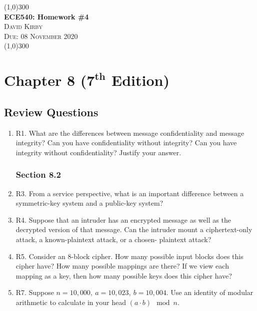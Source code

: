 \documentclass[12pt]{article}
\begin{document}
\thispagestyle{empty}

 	\begin{center}
    \line(1,0){300}\\[0.25cm]
 	\Large{\bfseries ECE540: Homework \#4}\\
 	\textsc{\large David Kirby}\\
 	\textsc{\large Due: 08 November 2020}\\
 	\line(1,0){300}\\[0.75cm]
 	\end{center}
\section*{Chapter 8 (\(\bm{7^{th}}\) Edition)}
\subsection*{Review Questions}
\begin{enumerate}
\subsubsection*{Section 8.1}
\item R1. What are the differences between message confidentiality and message integrity? Can you have confidentiality without integrity? Can you have integrity without confidentiality? Justify your answer.
\subsubsection*{Section 8.2}
\item R3. From a service perspective, what is an important difference between a symmetric-key system and a public-key system?
\item R4. Suppose that an intruder has an encrypted message as well as the decrypted version of that message. Can the intruder mount a ciphertext-only attack, a known-plaintext attack, or a chosen- plaintext attack?
\item R5. Consider an 8-block cipher. How many possible input blocks does this cipher have? How many possible mappings are there? If we view each mapping as a key, then how many possible keys does this cipher have?
\item R7. Suppose \(n=10,000,\ a=10,023,\ b=10,004\). Use an identity of modular arithmetic to calculate in your head \( (a \cdot b)\mod{n}\).
\end{enumerate}
\end{document}
